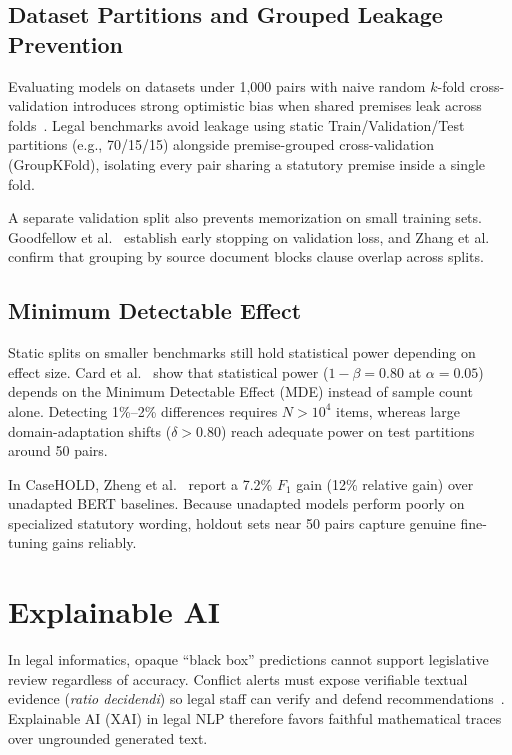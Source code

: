     \subsection{Dataset Partitions and Grouped Leakage Prevention}
    Evaluating models on datasets under 1,000 pairs with naive random $k$-fold cross-validation introduces strong optimistic bias when shared premises leak across folds~\cite{vabalas2019machine}. Legal benchmarks avoid leakage using static Train/Validation/Test partitions (e.g., 70/15/15) alongside premise-grouped cross-validation (GroupKFold), isolating every pair sharing a statutory premise inside a single fold.

    A separate validation split also prevents memorization on small training sets. Goodfellow et al.~\cite{goodfellow2016deep} establish early stopping on validation loss, and Zhang et al.~\cite{zhang2021revisiting} confirm that grouping by source document blocks clause overlap across splits.

    \subsection{Minimum Detectable Effect}
    Static splits on smaller benchmarks still hold statistical power depending on effect size. Card et al.~\cite{card2020with} show that statistical power ($1 - \beta = 0.80$ at $\alpha = 0.05$) depends on the Minimum Detectable Effect (MDE) instead of sample count alone. Detecting 1\%--2\% differences requires $N > 10^4$ items, whereas large domain-adaptation shifts ($\delta > 0.80$) reach adequate power on test partitions around 50 pairs.

    In CaseHOLD, Zheng et al.~\cite{zheng2021when} report a 7.2\% $F_1$ gain (12\% relative gain) over unadapted BERT baselines. Because unadapted models perform poorly on specialized statutory wording, holdout sets near 50 pairs capture genuine fine-tuning gains reliably.

\section{Explainable AI}
In legal informatics, opaque ``black box'' predictions cannot support legislative review regardless of accuracy. Conflict alerts must expose verifiable textual evidence (\textit{ratio decidendi}) so legal staff can verify and defend recommendations~\cite{doshi2017towards}. Explainable AI (XAI) in legal NLP therefore favors faithful mathematical traces over ungrounded generated text.

